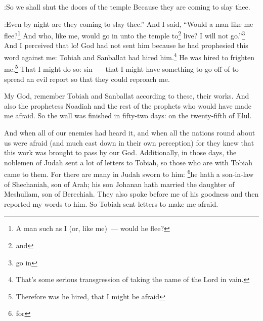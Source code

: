 \begin{inparaenum}
:So we shall shut the doors of the temple Because they are coming to slay thee.

:Even by night are they coming to slay thee.''%
     And I said, ``Would a man like me flee?\footnote{A man such as I (or, like me)~--- would he flee?} And who, like me, would go in unto the temple to\footnote{and} live? I will not go.''\footnote{go in}%
     And I perceived that lo! God had not sent him because he had prophesied this word against me: Tobiah and Sanballat had hired him.\footnote{That's some serious transgression of taking the name of the Lord in vain.}%
     He was hired to frighten me.\footnote{Therefore was he hired, that I might be afraid} That I might do so: sin~--- that I might have something to go off of to spread an evil report so that they could reproach me.%
    
     My God, remember Tobiah and Sanballat according to these, their works. And also the prophetess Noadiah and the rest of the prophets who would have made me afraid.%
     So the wall was finished in fifty-two days: on the twenty-fifth of Elul.%
    
     And when all of our enemies had heard it, and when all the nations round about us were afraid (and much cast down in their own perception) for they knew that this work was brought to pass by our God.%
     Additionally, in those days, the noblemen of Judah sent a lot of letters to Tobiah, so those who are with Tobiah came to them.%
     For there are many in Judah sworn to him: \footnote{for}he hath a son-in-law of Shechaniah, son of Arah; his son Johanan hath married the daughter of Meshullam, son of Berechiah.%
     They also spoke before me of his goodness and then reported my words to him. So Tobiah sent letters to make me afraid.%
\end{inparaenum}
